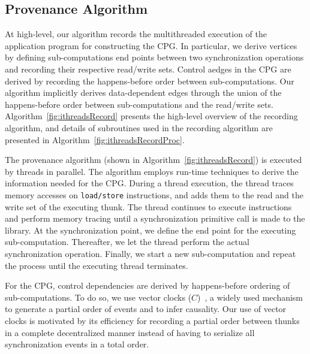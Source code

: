  
 
 \subsection{ Provenance Algorithm}

 
 
At high-level, our algorithm records the multithreaded execution of the
application program for constructing the CPG.
In particular, we derive vertices  by defining
sub-computations end points between two synchronization operations and recording their respective read/write sets. Control aedges in the CPG are derived by recording the happens-before order between sub-computations. Our algorithm implicitly derives data-dependent edges through the union of the happens-before order between sub-computations and the read/write sets. Algorithm~\ref{fig:ithreadsRecord} presents the high-level
overview of the recording algorithm, and details of subroutines used in the recording algorithm are presented in Algorithm~\ref{fig:ithreadsRecordProc}.
  

   The provenance algorithm (shown in Algorithm~\ref{fig:ithreadsRecord}) is executed by threads in parallel. The algorithm employs run-time techniques to derive the information needed for the CPG. During a thread execution, the thread traces memory accesses on {\tt load/store} instructions, and adds them to the read and
the write set of the executing thunk. The thread continues to execute instructions and perform memory tracing until a synchronization primitive call is made to the \pthreads  library. At the synchronization point, we define the end point for the executing sub-computation. 
Thereafter, we let the thread perform the actual synchronization operation.
Finally, we start a new sub-computation and repeat the process until the executing thread
terminates. 

 
 

 For the CPG, control dependencies are derived by 
happens-before ordering of sub-computations. To do so, we use vector clocks
($C$)~\cite{Mattern89virtualtime},  a widely used mechanism to generate a partial order of events and to infer causality. Our use of vector
clocks is motivated by its efficiency for recording a partial order between thunks in a complete decentralized manner instead of having to serialize all synchronization events in a total order.

